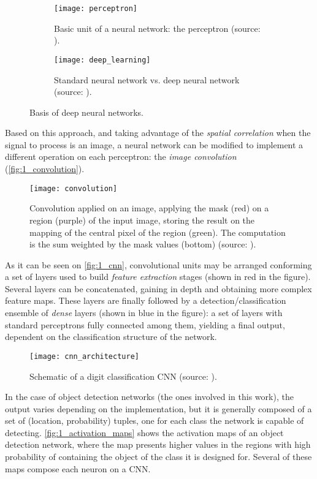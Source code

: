 \begin{figure}[h]
	\centering
	\begin{subfigure}[t]{0.35\linewidth}
		\centering
		\texttt{[image: perceptron]}
		\caption{Basic unit of a neural network: the perceptron (source: \cite{tfg}).}
		\label{fig:1_perceptron}
	\end{subfigure}
	\begin{subfigure}[t]{0.5\linewidth}
		\centering
		\texttt{[image: deep\_learning]}
		\caption{Standard neural network vs. deep neural network (source: \cite{tfg}).}
		\label{fig:1_deep_learning}
	\end{subfigure}
	\caption{Basis of deep neural networks.}
	\label{fig:1_dnns}
\end{figure}

\vspace{8cm}

Based on this approach, and taking advantage of the \textit{spatial correlation} when the signal to process is an image, a neural network can be modified to implement a different operation on each perceptron: the \textit{image convolution} (\autoref{fig:1_convolution}).

\begin{figure}[h]
	\centering
	\texttt{[image: convolution]}
	\caption{Convolution applied on an image, applying the mask (red) on a region  (purple) of the input image, storing the result on the mapping of the central pixel of the region (green). The computation is the sum weighted by the mask values (bottom) (source: \cite{tfg}).}
	\label{fig:1_convolution}
\end{figure}

As it can be seen on \autoref{fig:1_cnn}, convolutional units may be arranged conforming a set of layers used to build \textit{feature extraction} stages (shown in red in the figure). Several layers can be concatenated, gaining in depth and obtaining more complex feature maps. These layers are finally followed by a detection/classification ensemble of \textit{dense} layers (shown in blue in the figure): a set of layers with standard perceptrons fully connected among them, yielding a final output, dependent on the classification structure of the network.

\begin{figure}[h]
	\centering
	\texttt{[image: cnn\_architecture]}
	\caption{Schematic of a digit classification CNN (source: \cite{tfg}).}
	\label{fig:1_cnn}
\end{figure}
\vspace{8cm}
In the case of object detection networks (the ones involved in this work), the output varies depending on the implementation, but it is generally composed of a set of (location, probability) tuples, one for each class the network is capable of detecting. \autoref{fig:1_activation_maps} shows the activation maps of an object detection network, where the map presents higher values in the regions with high probability of containing the object of the class it is designed for. Several of these maps compose each neuron on a CNN.

